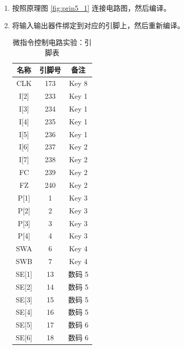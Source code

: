 \begin{enumerate}
    \item 按照原理图 \ref{fig:prin5_1} 连接电路图，然后编译。
    \item 将输入输出器件绑定到对应的引脚上，然后重新编译。
    
    
    \begin{table}[H]
        \centering
        \begin{tabular}{|c|c|c|}
            \hline
            名称 & 引脚号 & 备注 \\
            \hline
            CLK & 173 & Key 8 \\
            \hline
            I[2] & 233 & Key 1 \\
            \hline
            I[3] & 234 & Key 1 \\
            \hline
            I[4] & 235 & Key 1 \\
            \hline
            I[5] & 236 & Key 1 \\
            \hline
            I[6] & 237 & Key 2 \\
            \hline
            I[7] & 238 & Key 2 \\
            \hline
            FC & 239 & Key 2 \\
            \hline
            FZ & 240 & Key 2 \\
            \hline
            P[1] & 1 & Key 3 \\
            \hline
            P[2] & 2 & Key 3 \\
            \hline
            P[3] & 3 & Key 3 \\
            \hline
            P[4] & 4 & Key 3 \\
            \hline
            SWA & 6 & Key 4 \\
            \hline
            SWB & 7 & Key 4 \\
            \hline
            SE[1] & 13 & 数码 5 \\
            \hline
            SE[2] & 14 & 数码 5 \\
            \hline
            SE[3] & 15 & 数码 5 \\
            \hline
            SE[4] & 16 & 数码 5 \\
            \hline
            SE[5] & 17 & 数码 6 \\
            \hline
            SE[6] & 18 & 数码 6 \\
            \hline
        \end{tabular}
        \caption{微指令控制电路实验：引脚表}
        \label{tab:pin5_1}
    \end{table}
    

\end{enumerate}
